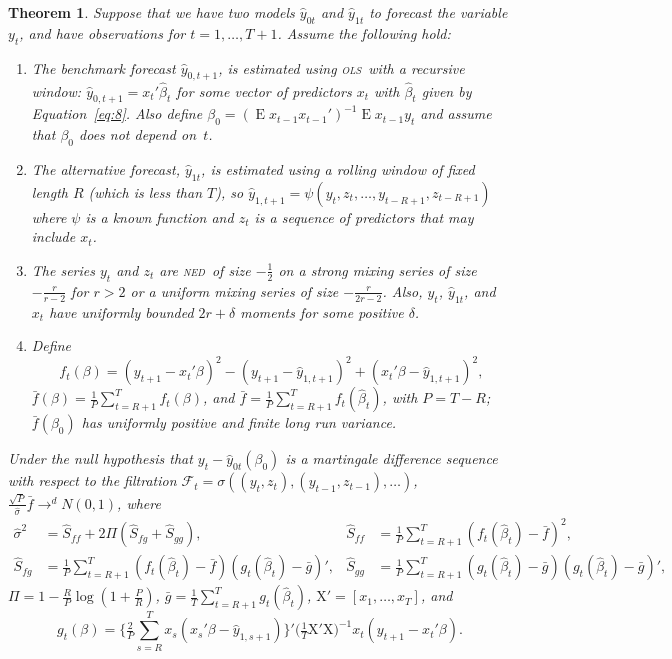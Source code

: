 \documentclass[11pt,fleqn]{article}
\newtheorem{thm}{Theorem}
\theoremstyle{definition}
\DeclareMathOperator{\E}{E}
\newcommand{\X}{\ensuremath{\mathrm{X}}}
\newcommand{\ned}{\textsc{ned}}
\newcommand{\ols}{\textsc{ols}}
\begin{document}
\begin{thm}\label{res:1}
  Suppose that we have two models $\hat{y}_{0t}$ and $\hat{y}_{1t}$ to
  forecast the variable $y_t$, and have observations for
  $t=1,\dots,T+1$.  Assume the following hold:
  \begin{enumerate}
  \item \label{item:1} The benchmark forecast $\hat{y}_{0,t+1}$, is
    estimated using \ols\ with a recursive window:
    $\hat{y}_{0,t+1} = x_t'\hat{\beta}_t$ for some vector of
    predictors $x_t$ with $\hat{\beta}_t$ given by
    Equation~\eqref{eq:8}.  Also define $\beta_0 = (\E x_{t-1}
    x_{t-1}')^{-1} \E x_{t-1} y_t$ and assume that $\beta_0$ does not depend
    on~$t$.
  \item \label{item:2} The alternative forecast, $\hat{y}_{1t}$, is
    estimated using a rolling window of fixed length $R$ (which is
    less than $T$), so $\hat{y}_{1,t+1} =
    \psi(y_t,z_t,\dots,y_{t-R+1}, z_{t-R+1})$ where $\psi$ is a known
    function and $z_t$ is a sequence of predictors that may include
    $x_t$.
  \item \label{item:3} The series $y_t$ and $z_t$ are \ned\ of size
    $-\frac12$ on a strong mixing series of size $-\frac{r}{r-2}$ for $r>2$ or a
    uniform mixing series of size $-\frac{r}{2r-2}$.  Also, $y_t$,
    $\hat{y}_{1t}$, and $x_t$ have uniformly bounded $2 r+\delta$
    moments for some positive $\delta$.
  \item \label{item:4} Define \[f_t(\beta) = (y_{t+1} - x_t'\beta)^2 -
    (y_{t+1} - \hat{y}_{1,t+1})^2 + (x_t'\beta - \hat{y}_{1,t+1})^2,\]
    $\bar{f}(\beta) = \tfrac1P \sum_{t=R+1}^T f_t(\beta)$, and $\bar f
    = \tfrac1P \sum_{t=R+1}^{T} f_t(\hat{\beta}_t)$, with $P = T - R$;
    $\bar f(\beta_0)$ has uniformly positive and finite long run
    variance.
  \end{enumerate}
  Under the null hypothesis that $y_t - \hat{y}_{0t}(\beta_0)$ is a
  martingale difference sequence with respect to the filtration
  $\mathcal{F}_t = \sigma((y_t, z_{t}), (y_{t-1}, z_{t-1}),\dots)$,
  $\tfrac{\sqrt{P}}{\hat\sigma} \bar f \to^d N(0,1)$, where 
  \begin{align*}
    \hat{\sigma}^2 &= \hat{S}_{ff} + 2 \Pi (\hat{S}_{fg} + \hat{S}_{gg}), &
    \hat{S}_{ff} &= \tfrac1P \sum_{t=R+1}^T (f_t(\hat{\beta}_t) - \bar
    f)^2, \\
    \hat{S}_{fg} &= \tfrac1P \sum_{t=R+1}^T (f_t(\hat{\beta}_t) -
    \bar{f})(g_t(\hat{\beta}_t) - \bar g)', &
    \hat{S}_{gg} &= \tfrac1P \sum_{t=R+1}^T (g_t(\hat{\beta}_t) - \bar
    g)(g_t(\hat{\beta}_t) - \bar g)',
  \end{align*}
  $\Pi = 1 - \tfrac{R}{P} \log(1 + \tfrac{P}{R})$, $\bar{g} = \tfrac1T
  \sum_{t=R+1}^T g_t(\hat{\beta}_t)$, $\X' = [x_1,\dots,x_T]$, and
  \begin{equation*}
    g_t(\beta) =
    \Big\{\tfrac{2}{P}\sum_{s=R}^T x_s (x_s'\beta - \hat{y}_{1,s+1}) \Big\}'
    \big(\tfrac1T \X'\X \big)^{-1} x_t(y_{t+1} - x_t'\beta).
  \end{equation*}
\end{thm}
\end{document}
